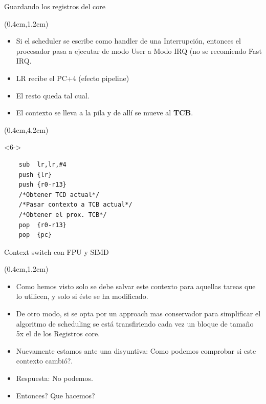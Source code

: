 \begin{frame}[fragile]{Guardando los registros del core}
 \begin{textblock*}{\textwidth}(0.4cm,1.2cm)
  \begin{itemize}[<+(1)->] \justifying
   \item Si el scheduler se escribe como handler de una Interrupción, entonces el procesador pasa a ejecutar de modo User a Modo IRQ (no se recomiendo Fast IRQ.
   \item LR recibe el PC+4 (efecto pipeline)
   \item El resto queda tal cual.
   \item El contexto se lleva a la pila y de allí se mueve al \textbf{TCB}.
  \end{itemize}
 \end{textblock*}
 \begin{textblock*}{\textwidth}(0.4cm,4.2cm)
  \begin{onlyenv}<6->
   \begin{lstlisting}
    sub  lr,lr,#4
    push {lr}
    push {r0-r13}
    /*Obtener TCD actual*/
    /*Pasar contexto a TCB actual*/
    /*Obtener el prox. TCB*/
    pop  {r0-r13}
    pop  {pc}
   \end{lstlisting}
  \end{onlyenv}
 \end{textblock*}
\end{frame}

\begin{frame}{Context switch con FPU y SIMD}
 \begin{textblock*}{\textwidth}(0.4cm,1.2cm)
  \begin{itemize}[<+(1)->] \justifying
   \item Como hemos visto solo se debe salvar este contexto para aquellas tareas que lo utilicen, y solo si éste se ha modificado.
   \item De otro modo, si se opta por un approach mas conservador para simplificar el algoritmo de scheduling se está transfiriendo cada vez un bloque de tamaño 5x el de los Registros core.
   \item Nuevamente estamos ante una disyuntiva: \textquestiondown Como podemos comprobar si este contexto cambió?.
   \item Respuesta: No podemos.
   \item \textquestiondown Entonces? \textquestiondown Que hacemos?
  \end{itemize}
 \end{textblock*}
\end{frame}

